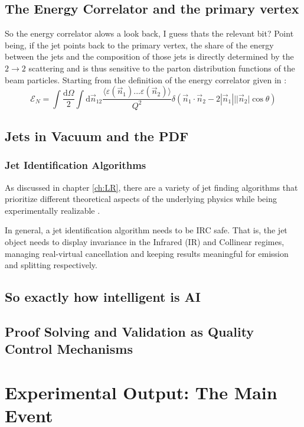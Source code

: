 \documentclass[letterpaper, 12pt, oneside]{book}
\newcommand{\dd}{\textrm{d}}
\theoremstyle{definition}
\begin{document}
\chapter{The Energy Correlator and the primary vertex}
	So the energy correlator alows a look back, I guess thats the relevant bit? 
	Point being, if the jet points back to the primary vertex, the share of the energy between the jets and the composition of those jets is directly determined by the $2 \rightarrow 2$ scattering and is thus sensitive to the parton distribution functions of the beam particles. 
	Starting from the definition of the energy correlator given in \cite{Larkoski2013}:
	\begin{equation}
		\mathcal{E}_{N} = \int \frac{\dd \Omega}{2} \int \dd \vec{n}_{12} \frac{\langle \varepsilon \left( \vec{n}_1 \right) ... \varepsilon \left(\vec{n}_2 \right)\rangle}{Q^2} \delta\left( \vec{n}_1 \cdot \vec{n}_2 - 2|\vec{n}_1|||\vec{n}_2|\cos  \theta \right)
		\label{eq:ENC}
	\end{equation}
\chapter{Jets in Vacuum and the PDF}
\section{Jet Identification Algorithms}
As discussed in chapter \ref{ch:LR}, there are a variety of jet finding algorithms that prioritize different theoretical aspects of the underlying physics while being experimentally realizable \cite{Dokshitzer1997} \cite{Atkin2015}. 

In general, a jet identification algorithm needs to be IRC safe. 
That is, the jet object needs to display invariance in the Infrared (IR) and Collinear regimes, managing real-virtual cancellation and keeping results meaningful for emission and splitting respectively. 

\chapter{So exactly how intelligent is AI}
\chapter{Proof Solving and Validation as Quality Control Mechanisms}
\part{Experimental Output: The Main Event}
\end{document}
